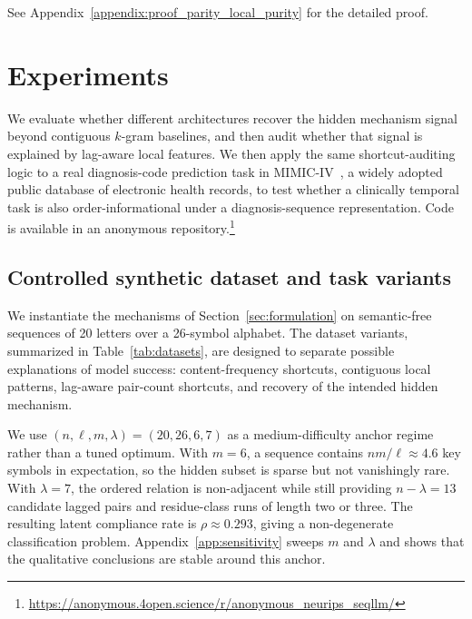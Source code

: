 \documentclass[fullpaper]{nldl}
\theoremstyle{plain}
\theoremstyle{definition}
\theoremstyle{remark}
\begin{document}
See Appendix~\ref{appendix:proof_parity_local_purity} for the detailed proof.

\section{Experiments}
\label{sec:experiments}

We evaluate whether different architectures recover the hidden mechanism signal beyond contiguous $k$-gram baselines, and then audit whether that signal is explained by lag-aware local features. We then apply the same shortcut-auditing logic to a real diagnosis-code prediction task in MIMIC-IV~\citep{johnson2023mimiciv}, a widely adopted public database of electronic health records, to test whether a clinically temporal task is also order-informational under a diagnosis-sequence representation. Code is available in an anonymous repository.\footnote{\url{https://anonymous.4open.science/r/anonymous_neurips_seqllm/}}

\subsection{Controlled synthetic dataset and task variants}
\label{sec:task_variants}

We instantiate the mechanisms of Section~\ref{sec:formulation} on semantic-free sequences of 20 letters over a 26-symbol alphabet. The dataset variants, summarized in Table~\ref{tab:datasets}, are designed to separate possible explanations of model success: content-frequency shortcuts, contiguous local patterns, lag-aware pair-count shortcuts, and recovery of the intended hidden mechanism.

We use $(n,\ell,m,\lambda)=(20,26,6,7)$ as a medium-difficulty anchor regime rather than a tuned optimum. With $m=6$, a sequence contains $nm/\ell \approx 4.6$ key symbols in expectation, so the hidden subset is sparse but not vanishingly rare. With $\lambda=7$, the ordered relation is non-adjacent while still providing $n-\lambda=13$ candidate lagged pairs and residue-class runs of length two or three. The resulting latent compliance rate is $\rho \approx 0.293$, giving a non-degenerate classification problem. Appendix~\ref{app:sensitivity} sweeps $m$ and $\lambda$ and shows that the qualitative conclusions are stable around this anchor.
\end{document}
